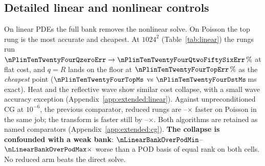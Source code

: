\subsection{Detailed linear and nonlinear controls}


On linear PDEs the full bank removes the nonlinear solve. On Poisson the
top rung is the most accurate and cheapest. At
$1024^2$ (Table~\ref{tab:linear}) the rungs run
$\nPlinTenTwentyFourQzeroErr\to\nPlinTenTwentyFourQtwoFiftySixErr\,\%$ at
flat cost, and $q=R$ lands on the floor at $\nPlinTenTwentyFourTopErr\,\%$
as the \emph{cheapest} point ($\nPlinTenTwentyFourTopMs$ vs
$\nPlinTenTwentyFourDstMs$\,ms exact). Heat and the reflective wave
show similar cost collapse, with a small wave accuracy exception
(Appendix~\ref{app:extended:linear}). Against unpreconditioned
CG at $10^{-6}$, the previous comparator, reduced rungs are
\nCgPoissonSpeedupMin--\nCgPoissonSpeedupMax$\times$ faster on Poisson in the
same job; the transform is faster still by
\nCgPoissonDstFasterMin--\nCgPoissonDstFasterMax$\times$. Both algorithms are retained as named
comparators (Appendix~\ref{app:extended:cg}). \textbf{The collapse
is confounded with a weak bank}:
$\nLinearBankOverPodMin$--$\nLinearBankOverPodMax\times$ worse than a POD
basis of equal rank on both cells. No reduced arm beats the direct
solve.

